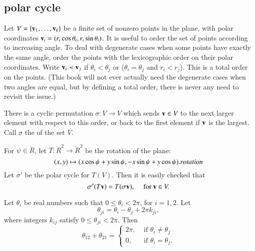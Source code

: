 \subsection{polar cycle}

Let $V=\{{\mathbf v}_1,\ldots,{\mathbf v}_k\}$ be a finite set of nonzero points in the
plane, with polar coordinates ${\mathbf v}_i =
(r_i\cos\theta_i,r_i\sin\theta_i)$.  It is useful to order the set of
points according to increasing angle.  To deal with degenerate cases
when some points have exactly the same angle, order the points with
the lexicographic order on their polar coordinates.  Write ${\mathbf v}_i \prec
{\mathbf v}_j$ if $\theta_i < \theta_j$ or ($\theta_i=\theta_j$ and $r_i<r_j$).
This is a total order on the points.  (This book will not ever
actually need the degenerate cases when two angles are equal, but by
defining a total order, there is never any need to revisit the issue.)
%

\begin{definition}
There is a cyclic permutation $\sigma:V\to V$ which sends ${\mathbf v}\in V$ to
the next larger element with respect to this order, or back to the
first element if ${\mathbf v}$ is the largest.  Call $\sigma$ the
 of the set $V$.
\end{definition}
%
%
%
%




For $\psi\in\ring{R}$, let $T:\ring{R}^2\to\ring{R}^2$ be the
rotation of the plane:
\begin{equation}
\label{eqn:rotate}
(x,y) \mapsto  (x\cos\psi + y\sin\psi,-x\sin\psi+y\cos\psi).
\indy{Index}{rotation}%
\end{equation}
Let $\sigma'$ be the polar cycle for $T(V)$.  Then it is easily
checked that
\begin{displaymath}
\sigma'(T {\mathbf v}) = T (\sigma {\mathbf v}),\quad \text{ for } {\mathbf v}\in V. 
\end{displaymath}
%
%

\begin{lemma}[]\label{lemma:polar2}
    
   Let $\theta_i$ be real numbers such that $0\le
  \theta_i < 2\pi$, for $i=1,2$.  Let \begin{displaymath} \theta_{ji}
    = \theta_i - \theta_j + 2\pi k_{ji},
\end{displaymath}
where integers $k_{ij}$ satisfy $0\le \theta_{ji}< 2\pi$.
Then 
\begin{displaymath}
\theta_{12} + \theta_{21} = \begin{cases}
2\pi, & \text{ if }\theta_i\ne\theta_j\\
0,    & \text{ if }\theta_i=\theta_j.
\end{cases}
\end{displaymath}
\end{lemma}
%

